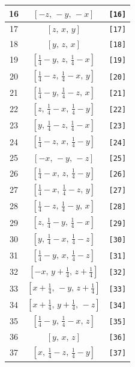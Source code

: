 \documentclass[fleqn,8pt]{jsarticle}
\begin{document}
\begin{longtable}{ccc}
16 & $\left[ - z,\, - y,\, - x \right]$ & {\tt [16]} \\ \hline
17 & $\left[ z,\, x,\, y \right]$ & {\tt [17]} \\ \hline
18 & $\left[ y,\, z,\, x \right]$ & {\tt [18]} \\ \hline
19 & $\left[ \frac{1}{4} - y,\, z,\, \frac{1}{4} - x \right]$ & {\tt [19]} \\ \hline
20 & $\left[ \frac{1}{4} - z,\, \frac{1}{4} - x,\, y \right]$ & {\tt [20]} \\ \hline
21 & $\left[ \frac{1}{4} - y,\, \frac{1}{4} - z,\, x \right]$ & {\tt [21]} \\ \hline
22 & $\left[ z,\, \frac{1}{4} - x,\, \frac{1}{4} - y \right]$ & {\tt [22]} \\ \hline
23 & $\left[ y,\, \frac{1}{4} - z,\, \frac{1}{4} - x \right]$ & {\tt [23]} \\ \hline
24 & $\left[ \frac{1}{4} - z,\, x,\, \frac{1}{4} - y \right]$ & {\tt [24]} \\ \hline
25 & $\left[ - x,\, - y,\, - z \right]$ & {\tt [25]} \\ \hline
26 & $\left[ \frac{1}{4} - x,\, z,\, \frac{1}{4} - y \right]$ & {\tt [26]} \\ \hline
27 & $\left[ \frac{1}{4} - x,\, \frac{1}{4} - z,\, y \right]$ & {\tt [27]} \\ \hline
28 & $\left[ \frac{1}{4} - z,\, \frac{1}{4} - y,\, x \right]$ & {\tt [28]} \\ \hline
29 & $\left[ z,\, \frac{1}{4} - y,\, \frac{1}{4} - x \right]$ & {\tt [29]} \\ \hline
30 & $\left[ y,\, \frac{1}{4} - x,\, \frac{1}{4} - z \right]$ & {\tt [30]} \\ \hline
31 & $\left[ \frac{1}{4} - y,\, x,\, \frac{1}{4} - z \right]$ & {\tt [31]} \\ \hline
32 & $\left[ - x,\, y + \frac{1}{4},\, z + \frac{1}{4} \right]$ & {\tt [32]} \\ \hline
33 & $\left[ x + \frac{1}{4},\, - y,\, z + \frac{1}{4} \right]$ & {\tt [33]} \\ \hline
34 & $\left[ x + \frac{1}{4},\, y + \frac{1}{4},\, - z \right]$ & {\tt [34]} \\ \hline
35 & $\left[ \frac{1}{4} - y,\, \frac{1}{4} - x,\, z \right]$ & {\tt [35]} \\ \hline
36 & $\left[ y,\, x,\, z \right]$ & {\tt [36]} \\ \hline
37 & $\left[ x,\, \frac{1}{4} - z,\, \frac{1}{4} - y \right]$ & {\tt [37]} \\ \hline

\end{longtable}
\end{document}
